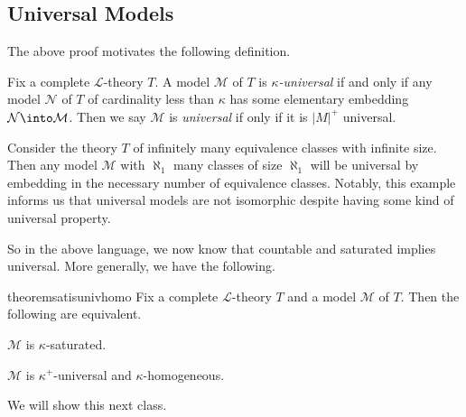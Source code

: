 \documentclass[../notes.tex]{subfiles}
\begin{document}
\subsection{Universal Models}
The above proof motivates the following definition.
\begin{defihelper} 
	Fix a complete $\mathcal L$-theory $T$. A model $\mathcal M$ of $T$ is \textit{$\kappa$-universal} if and only if any model $\mathcal N$ of $T$ of cardinality less than $\kappa$ has some elementary embedding $\mathcal N\into\mathcal M$. Then we say $\mathcal M$ is \textit{universal} if only if it is $\left|M\right|^+$ universal.
\end{defihelper}
\begin{example}
	Consider the theory $T$ of infinitely many equivalence classes with infinite size. Then any model $\mathcal M$ with $\aleph_1$ many classes of size $\aleph_1$ will be universal by embedding in the necessary number of equivalence classes. Notably, this example informs us that universal models are not isomorphic despite having some kind of universal property.
\end{example}
So in the above language, we now know that countable and saturated implies universal. More generally, we have the following.
\begin{restatable}{theorem}{satisunivhomo} \label{thm:saturated-is-univ-homo}
	Fix a complete $\mathcal L$-theory $T$ and a model $\mathcal M$ of $T$. Then the following are equivalent.
	\begin{listalph}
		\item $\mathcal M$ is $\kappa$-saturated.
		\item $\mathcal M$ is $\kappa^+$-universal and $\kappa$-homogeneous.
	\end{listalph}
\end{restatable}
We will show this next class.
\end{document}
